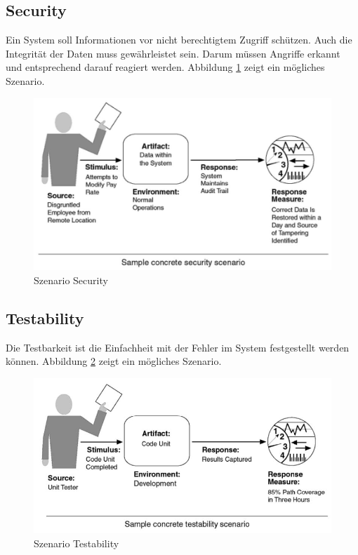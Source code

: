 \newpage

\subsection{Security}

Ein System soll Informationen vor nicht berechtigtem Zugriff schützen. Auch die Integrität der Daten muss gewährleistet sein. Darum müssen Angriffe erkannt und entsprechend darauf reagiert werden. Abbildung \ref{fig:security} zeigt ein mögliches Szenario.

\begin{figure}[h!]
\centering
\includegraphics[width=0.7\linewidth]{fig/security}
\caption{Szenario Security}
\label{fig:security}
\end{figure}

\subsection{Testability}

Die Testbarkeit ist die Einfachheit mit der Fehler im System festgestellt werden können. Abbildung \ref{fig:testability} zeigt ein mögliches Szenario.

\begin{figure}[h!]
\centering
\includegraphics[width=0.7\linewidth]{fig/testability}
\caption{Szenario Testability}
\label{fig:testability}
\end{figure}

\newpage

